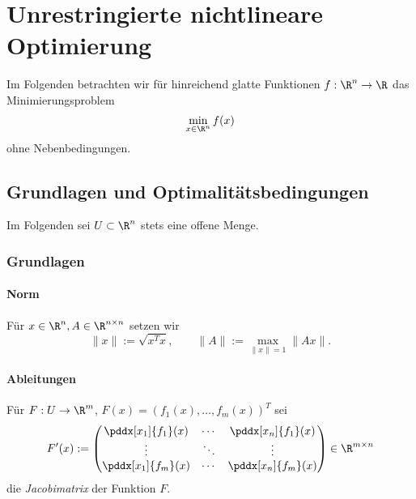 \chapter{Unrestringierte nichtlineare Optimierung}


Im Folgenden betrachten wir für hinreichend glatte Funktionen $f: \R^n \to \R$ das Minimierungsproblem
\[
	\min_{x\in \R^n} f(x)
\]
ohne Nebenbedingungen.


\section{Grundlagen und Optimalitätsbedingungen}


\begin{conv*}
	Im Folgenden sei $U \subset \R^n$ stets eine offene Menge.
\end{conv*}


\subsection{Grundlagen}

\subsubsection{Norm}

Für $x \in \R^n, A \in \R^{n\times n}$ setzen wir
\[
	\|x\| := \sqrt{x^T x}, \qquad
	\|A\| := \max_{\|x\|=1} \|Ax\|.
\]

\subsubsection{Ableitungen}

Für $F: U \to \R^m$, $F(x) = (f_1(x), \dotsc, f_m(x))^T$ sei
\[
	F'(x) := \begin{pmatrix}
		\pddx[x_1]{f_1}(x) & \cdots & \pddx[x_n]{f_1}(x) \\
		\vdots & \ddots & \vdots \\
		\pddx[x_1]{f_m}(x) & \cdots & \pddx[x_n]{f_m}(x) \\
	\end{pmatrix} \in \R^{m\times n}
\]
die \emph{Jacobimatrix} der Funktion $F$.


